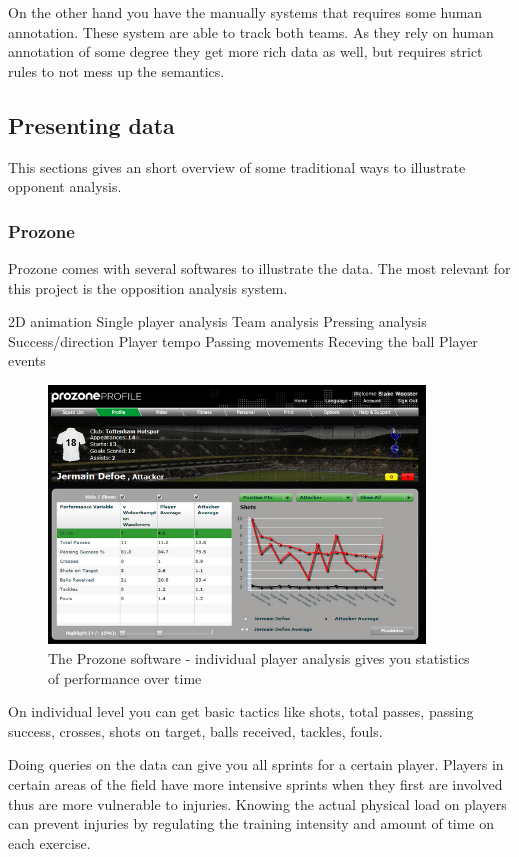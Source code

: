 On the other hand you have the manually systems that requires some human annotation. These system are able to track both teams. As they rely on human annotation of some degree they get more rich data as well, but requires strict rules to not mess up the semantics. 


\subsection{Presenting data}

This sections gives an short overview of some traditional ways to illustrate opponent analysis. 

\subsubsection{Prozone}


Prozone comes with several softwares to illustrate the data. The most relevant for this project is the opposition analysis system. 

2D animation
Single player analysis
Team analysis
Pressing analysis
Success/direction
Player tempo
Passing movements
Receving the ball
Player events

\begin{figure}[ht!]
\centering
\includegraphics[width=100mm]{images/general/prozonestats.png}
\caption{The Prozone software - individual player analysis gives you statistics of performance over time}
\label{overflow}
\end{figure}

On individual level you can get basic tactics like shots, total passes, passing success, crosses, shots on target, balls received, tackles, fouls. 

Doing queries on the data can give you all sprints for a certain player. Players in certain areas of the field have more intensive sprints when they first are involved thus are more vulnerable to injuries. Knowing the actual physical load on players can prevent injuries by regulating the training intensity and amount of time on each exercise.


